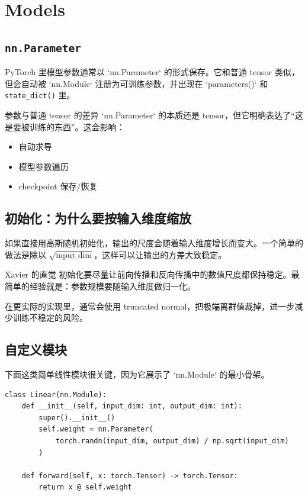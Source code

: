 \documentclass[a4paper]{article}
\begin{document}
\section{Models}

\subsection{\texttt{nn.Parameter}}

PyTorch 里模型参数通常以 `nn.Parameter` 的形式保存。它和普通 tensor 类似，但会自动被 `nn.Module` 注册为可训练参数，并出现在 `parameters()` 和 \texttt{state\_dict()} 里。

\begin{knowledgebox}{参数与普通 tensor 的差异}
`nn.Parameter` 的本质还是 tensor，但它明确表达了“这是要被训练的东西”。这会影响：
\begin{itemize}
    \item 自动求导
    \item 模型参数遍历
    \item checkpoint 保存/恢复
\end{itemize}
\end{knowledgebox}

\subsection{初始化：为什么要按输入维度缩放}

如果直接用高斯随机初始化，输出的尺度会随着输入维度增长而变大。一个简单的做法是除以 \(\sqrt{\text{input\_dim}}\)，这样可以让输出的方差大致稳定。

\begin{importantbox}{Xavier 的直觉}
初始化要尽量让前向传播和反向传播中的数值尺度都保持稳定。最简单的经验就是：参数规模要随输入维度做归一化。
\end{importantbox}

在更实际的实现里，通常会使用 truncated normal，把极端离群值裁掉，进一步减少训练不稳定的风险。

\subsection{自定义模块}

下面这类简单线性模块很关键，因为它展示了 `nn.Module` 的最小骨架。

\begin{lstlisting}
class Linear(nn.Module):
    def __init__(self, input_dim: int, output_dim: int):
        super().__init__()
        self.weight = nn.Parameter(
            torch.randn(input_dim, output_dim) / np.sqrt(input_dim)
        )

    def forward(self, x: torch.Tensor) -> torch.Tensor:
        return x @ self.weight
\end{lstlisting}
\end{document}
